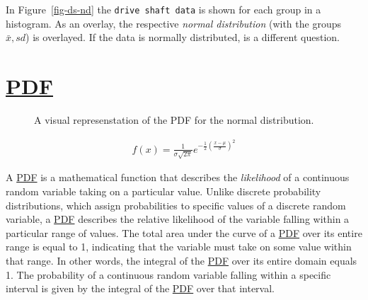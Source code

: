 \documentclass[
  a4paper,
]{scrbook}
\begin{document}
In Figure~\ref{fig-ds-nd} the \texttt{drive\ shaft\ data} is shown for
each group in a histogram. As an overlay, the respective \emph{normal
distribution} (with the groups \(\bar{x},sd\)) is overlayed. If the data
is normally distributed, is a different question.

\section{\texorpdfstring{\hyperref[acronyms_PDF]{PDF}}{PDF}}\label{section-3}

\begin{figure}[ht]


\caption{\label{fig-pdf-000-scr}A visual represenstation of the PDF for
the normal distribution.}

\end{figure}%

\begin{align}
f(x) = \frac{1}{\sigma\sqrt{2\pi}}e^{-\frac{1}{2}(\frac{x-\mu}{\sigma})^2}
\end{align}

A \hyperref[acronyms_PDF]{PDF} is a mathematical function that describes
the \emph{likelihood} of a continuous random variable taking on a
particular value. Unlike discrete probability distributions, which
assign probabilities to specific values of a discrete random variable, a
\hyperref[acronyms_PDF]{PDF} describes the relative likelihood of the
variable falling within a particular range of values. The total area
under the curve of a \hyperref[acronyms_PDF]{PDF} over its entire range
is equal to 1, indicating that the variable must take on some value
within that range. In other words, the integral of the
\hyperref[acronyms_PDF]{PDF} over its entire domain equals 1. The
probability of a continuous random variable falling within a specific
interval is given by the integral of the \hyperref[acronyms_PDF]{PDF}
over that interval.
\end{document}
